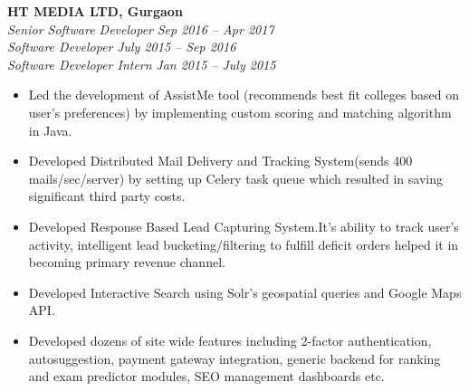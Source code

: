 \documentclass[margin,line]{resume}
\begin{document}
\begin{resume}
    \textbf{HT MEDIA LTD, Gurgaon}\\
           \textsl{Senior Software Developer} \hfill \textsl{Sep 2016 -- Apr 2017} \vspace{0mm}\\\vspace{0mm}%
           \textsl{Software Developer} \hfill \textsl{July 2015 -- Sep 2016} \vspace{0mm}\\\vspace{0mm}%
           \textsl{Software Developer Intern} \hfill \textsl{Jan 2015 -- July 2015} \vspace{1mm}%
    \begin{itemize}
			\item Led the development of AssistMe tool (recommends best fit colleges based on user's preferences) by implementing custom scoring and matching algorithm in Java.
            \item Developed Distributed Mail Delivery and Tracking System(sends 400 mails/sec/server) by setting up Celery task queue which resulted in saving significant third party costs.
            \item Developed Response Based Lead Capturing System.It's ability to track user's activity, intelligent lead bucketing/filtering to fulfill deficit orders helped it in becoming primary revenue channel.

            \item Developed Interactive Search using Solr's geospatial queries and Google Maps API.
            \item Developed dozens of site wide features including 2-factor authentication, autosuggestion, payment gateway integration, generic backend for ranking and exam predictor modules, SEO management dashboards etc.
      

\end{itemize}
\end{resume}
\end{document}
